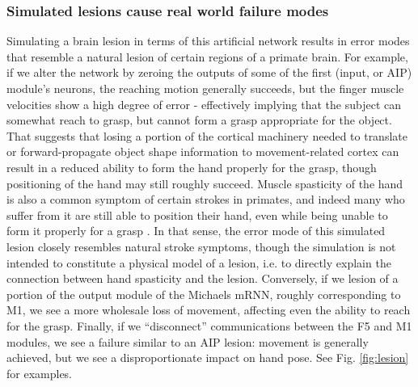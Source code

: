\documentclass[12pt]{iopart}
\begin{document}
\subsubsection{Simulated lesions cause real world failure modes}
Simulating a brain lesion in terms of this artificial network results in error
modes that resemble a natural lesion of certain regions of a primate brain. For example, if we
alter the network by zeroing the outputs of some of the first (input, or AIP) module's neurons,
the reaching motion generally succeeds, but the finger muscle velocities show a high degree
of error - effectively implying that the subject can somewhat reach to grasp, but cannot form a
grasp appropriate for the object. That suggests that losing a portion of the cortical
machinery needed to translate or forward-propagate object shape information
to movement-related cortex can result in a reduced ability to form the hand properly for
the grasp, though positioning of the hand may still roughly succeed. Muscle spasticity of
the hand is also a common symptom of certain strokes in primates, and indeed many who
suffer from it are still able to position their hand, even while being unable to form
it properly for a grasp \cite{khanna.openloop}. In that sense, the error mode of this
simulated lesion closely resembles natural stroke symptoms, though the simulation is not
intended to constitute a physical model of a lesion, i.e. to directly explain the
connection between hand spasticity and the lesion. Conversely, if we
lesion of a portion of the output module of the Michaels mRNN, roughly
corresponding to M1, we see a more wholesale loss of movement, affecting even the
ability to reach for the grasp. Finally, if we ``disconnect'' communications between the
F5 and M1 modules, we see a failure similar to an AIP lesion: movement is generally
achieved, but we see a disproportionate impact on hand pose.
See Fig. \ref{fig:lesion} for examples.
\end{document}
